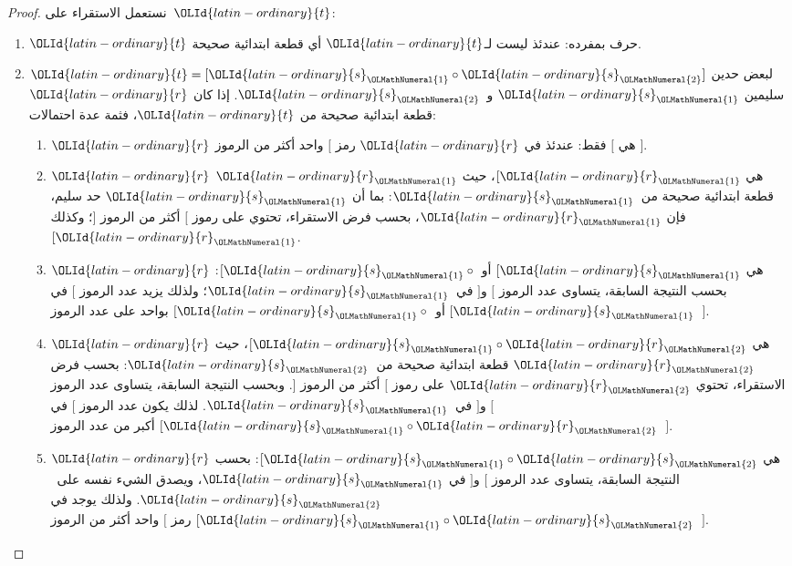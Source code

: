 \documentclass[../../../include/open-logic-section]{subfiles}
\begin{document}
\begin{proof}
  نستعمل الاستقراء على~$\OLId{latin-ordinary}{t}$:
  \begin{enumerate}
  \item $\OLId{latin-ordinary}{t}$ حرف بمفرده: عندئذ ليست لـ$\OLId{latin-ordinary}{t}$ أي قطعة ابتدائية صحيحة.
  \item $\OLId{latin-ordinary}{t} = [\OLId{latin-ordinary}{s}_\OLMathNumeral{1} \circ \OLId{latin-ordinary}{s}_\OLMathNumeral{2}]$ لبعض حدين سليمين $\OLId{latin-ordinary}{s}_\OLMathNumeral{1}$ و~$\OLId{latin-ordinary}{s}_\OLMathNumeral{2}$. إذا
    كان $\OLId{latin-ordinary}{r}$ قطعة ابتدائية صحيحة من $\OLId{latin-ordinary}{t}$، فثمة عدة احتمالات:
    \begin{enumerate}
    \item $\OLId{latin-ordinary}{r}$ هي $[$ فقط: عندئذ في $\OLId{latin-ordinary}{r}$ رمز $[$ واحد أكثر من الرموز
      $]$.
    \item $\OLId{latin-ordinary}{r}$ هي $[\OLId{latin-ordinary}{r}_\OLMathNumeral{1}$، حيث $\OLId{latin-ordinary}{r}_\OLMathNumeral{1}$ قطعة ابتدائية صحيحة من~$\OLId{latin-ordinary}{s}_\OLMathNumeral{1}$:
      بما أن $\OLId{latin-ordinary}{s}_\OLMathNumeral{1}$ حد سليم، فإن $\OLId{latin-ordinary}{r}_\OLMathNumeral{1}$، بحسب فرض الاستقراء، تحتوي على
      رموز $[$ أكثر من الرموز $]$؛ وكذلك $[\OLId{latin-ordinary}{r}_\OLMathNumeral{1}$.
    \item $\OLId{latin-ordinary}{r}$ هي $[\OLId{latin-ordinary}{s}_\OLMathNumeral{1}$ أو $[\OLId{latin-ordinary}{s}_\OLMathNumeral{1} \circ {}$: بحسب النتيجة السابقة،
      يتساوى عدد الرموز $[$ و$]$ في~$\OLId{latin-ordinary}{s}_\OLMathNumeral{1}$؛ ولذلك يزيد عدد الرموز $[$
      في $[\OLId{latin-ordinary}{s}_\OLMathNumeral{1}$ أو $[\OLId{latin-ordinary}{s}_\OLMathNumeral{1} \circ {}$ بواحد على عدد الرموز~$]$.
    \item $\OLId{latin-ordinary}{r}$ هي $[\OLId{latin-ordinary}{s}_\OLMathNumeral{1} \circ \OLId{latin-ordinary}{r}_\OLMathNumeral{2}$، حيث $\OLId{latin-ordinary}{r}_\OLMathNumeral{2}$ قطعة ابتدائية صحيحة
      من~$\OLId{latin-ordinary}{s}_\OLMathNumeral{2}$: بحسب فرض الاستقراء، تحتوي $\OLId{latin-ordinary}{r}_\OLMathNumeral{2}$ على رموز $[$ أكثر من
      الرموز $]$. وبحسب النتيجة السابقة، يتساوى عدد الرموز $[$ و$]$
      في~$\OLId{latin-ordinary}{s}_\OLMathNumeral{1}$. لذلك يكون عدد الرموز $[$ في $[\OLId{latin-ordinary}{s}_\OLMathNumeral{1} \circ \OLId{latin-ordinary}{r}_\OLMathNumeral{2}$ أكبر من
      عدد الرموز~$]$.
    \item $\OLId{latin-ordinary}{r}$ هي $[\OLId{latin-ordinary}{s}_\OLMathNumeral{1} \circ \OLId{latin-ordinary}{s}_\OLMathNumeral{2}$: بحسب النتيجة السابقة، يتساوى عدد
      الرموز $[$ و$]$ في $\OLId{latin-ordinary}{s}_\OLMathNumeral{1}$، ويصدق الشيء نفسه على~$\OLId{latin-ordinary}{s}_\OLMathNumeral{2}$. ولذلك
      يوجد في $[\OLId{latin-ordinary}{s}_\OLMathNumeral{1} \circ \OLId{latin-ordinary}{s}_\OLMathNumeral{2}$ رمز $[$ واحد أكثر من الرموز~$]$.
    \end{enumerate}
  \end{enumerate}
\end{proof}
\end{document}
